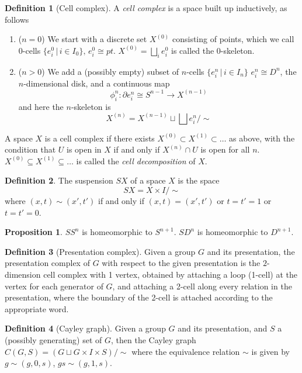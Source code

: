 \documentclass[a4paper,14pt]{extarticle}
\theoremstyle{definition}
\newtheorem*{definition}{Definition}
\newtheorem*{proposition}{Proposition}
\begin{document}
\begin{definition}[Cell complex]
  A \emph{cell complex} is a space built up inductively, as follows
  \begin{enumerate}
    \item ($n=0$) We start with a discrete set $X^{(0)}$ consisting of points, which we call 
    $0$-cells $\{e_i^0\,|\,i\in I_0\}, \,e_i^0\cong pt$. $X^{(0)}=\bigsqcup_i e_i^0$ is called the $0$-skeleton.
    \item ($n>0$) We add a (possibly empty) subset of $n$-cells $\{e_i^n\,|\,i\in I_n\}$ 
    $e_i^n\cong D^n$, the $n$-dimensional disk, and a continuous map 
    \[\phi_i^n:\partial e_i^n\cong S^{n-1}\rightarrow X^{(n-1)}\] and here the $n$-skeleton 
    is \[X^{(n)}=X^{(n-1)}\sqcup\bigsqcup e_i^n/\sim\]
  \end{enumerate}
  A space $X$ is a cell complex if there exists $X^{(0)}\subset X^{(1)}\subset\ldots$ 
  as above, with the condition that $U$ is open in $X$ if and only if 
  $X^{(n)}\cap U$ is open for all $n$. \\

  $X^{(0)}\subseteq X^{(1)}\subseteq\ldots$ is called the \emph{cell decomposition} of $X$.
\end{definition}

\begin{definition}
  The suspension $SX$ of a space $X$ is the space
  \[SX=X\times I/\sim\] where $(x,t)\sim (x',t')$ if and only if $(x,t)=(x',t')$ or 
  $t=t'=1$ or $t=t'=0$.
\end{definition}

\begin{proposition}
  $SS^n$ is homeomorphic to $S^{n+1}$. $SD^n$ is homeomorphic to $D^{n+1}$.
\end{proposition}

\begin{definition}[Presentation complex]
  Given a group $G$ and its presentation, the presentation complex of $G$ with respect
  to the given presentation is the 
  $2$-dimension cell complex with 1 vertex, obtained by attaching a loop (1-cell) at the vertex 
  for each generator of $G$, and attaching a 2-cell along every relation
  in the presentation, where the boundary of the 2-cell is attached according to 
  the appropriate word.
\end{definition}

\begin{definition}[Cayley graph]
  Given a group $G$ and its presentation, and $S$ a (possibly generating) set of $G$,
  then the Cayley graph $C(G,S)=(G\sqcup G\times I\times S)/\sim$ where the equivalence
  relation $\sim$ is given by $g\sim(g,0,s)$, $gs\sim(g,1,s)$.
\end{definition}
\end{document}
